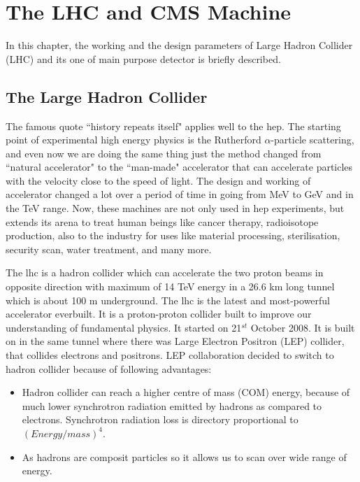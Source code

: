 \chapter{The LHC and CMS Machine}
In this chapter, the working and the design parameters of Large Hadron Collider (LHC) and its one of main purpose detector is briefly described.

\section{The Large Hadron Collider}
The famous quote ``history repeats itself" applies well to the \acrfull{hep}. The starting point of experimental high energy physics is the Rutherford $\alpha$-particle scattering, and even now we are doing the same thing just the method changed from ``natural accelerator" to the ``man-made" accelerator that can accelerate particles with the velocity close to the speed of light. The design and working of accelerator changed a lot over a period of time in going from MeV to GeV and in the TeV range. Now, these machines are not only used in \acrshort{hep} experiments, but extends its arena to treat human beings like cancer therapy, radioisotope production, also to the industry for uses like material processing, sterilisation, security scan, water treatment, and many more. 

The \acrfull{lhc} is  a hadron collider which can accelerate the two proton beams in opposite direction with maximum of 14 TeV energy in a 26.6 km long tunnel which is about 100 m underground.
The \acrfull{lhc} is the latest and most-powerful accelerator everbuilt. It is a proton-proton collider built to improve our understanding of fundamental physics. It started on 21$^{st}$ October 2008. It is built on in the same tunnel where there was Large Electron Positron (LEP) collider, that collides electrons and positrons. LEP collaboration decided to switch to hadron collider because of following advantages:
\begin{itemize}
    \item Hadron collider can reach a higher centre of mass (COM) energy, because of much lower synchrotron radiation emitted by hadrons as compared to electrons. Synchrotron radiation loss is directory proportional to $(Energy/mass)^4$.
    \item As hadrons are composit particles so it allows us to scan over wide range of energy.
\end{itemize}

